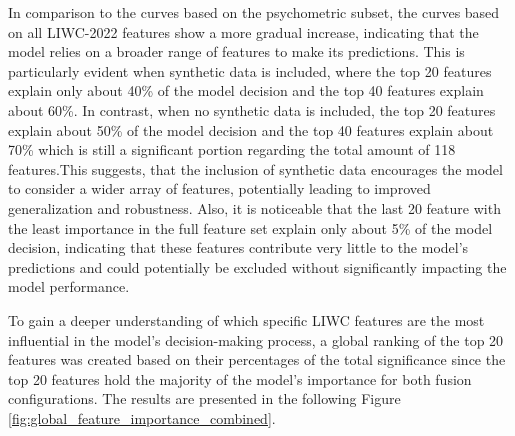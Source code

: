 In comparison to the curves based on the psychometric subset, the curves based on all LIWC-2022 features show a more gradual increase, indicating that the model relies on a broader range of features to make its predictions. This is particularly evident when synthetic data is included, where the top 20 features explain only about 40\% of the model decision and the top 40 features explain about 60\%. In contrast, when no synthetic data is included, the top 20 features explain about 50\% of the model decision and the top 40 features explain about 70\% which is still a significant portion regarding the total amount of 118 features.This suggests, that the inclusion of synthetic data encourages the model to consider a wider array of features, potentially leading to improved generalization and robustness. Also, it is noticeable that the last 20 feature with the least importance in the full feature set explain only about 5\% of the model decision, indicating that these features contribute very little to the model's predictions and could potentially be excluded without significantly impacting the model performance.

To gain a deeper understanding of which specific LIWC features are the most influential in the model's decision-making process, a global ranking of the top 20 features was created based on their percentages of the total significance since the top 20 features hold the majority of the model's importance for both fusion configurations. The results are presented in the following Figure \ref{fig:global_feature_importance_combined}.


